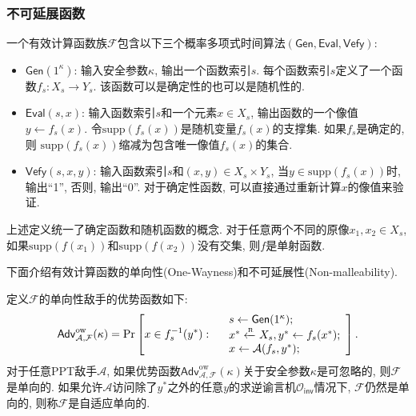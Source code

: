 \subsubsection{不可延展函数}
\begin{definition}[有效计算函数]
一个有效计算函数族$\mathcal{F}$包含以下三个概率多项式时间算法$(\mathsf{Gen}, \mathsf{Eval}, \mathsf{Vefy})$:  
\begin{itemize}
\item $\mathsf{Gen}(1^\kappa)$: 输入安全参数$\kappa$, 输出一个函数索引$s$. 每个函数索引$s$定义了一个函数$f_s: X_s \rightarrow Y_s$. 该函数可以是确定性的也可以是随机性的.

\item $\mathsf{Eval}(s, x)$: 输入函数索引$s$和一个元素$x \in X_s$, 输出函数的一个像值$y \leftarrow f_s(x)$. 令$\text{supp}(f_s(x))$是随机变量$f_s(x)$的支撑集. 如果$f_s$是确定的, 则 $\text{supp}(f_s(x))$缩减为包含唯一像值$f_s(x)$的集合.

\item $\mathsf{Vefy}(s, x, y)$: 输入函数索引$s$和$(x, y) \in X_s \times Y_s$, 当$y \in \text{supp}(f_s(x))$时, 输出``1'', 否则, 输出``0''. 对于确定性函数, 可以直接通过重新计算$x$的像值来验证.  
\end{itemize}
\end{definition}

\begin{note}
上述定义统一了确定函数和随机函数的概念. 对于任意两个不同的原像$x_1, x_2 \in X_s$, 如果$\text{supp}(f(x_1))$和$\text{supp}(f(x_2))$没有交集, 则$f$是单射函数.  
\end{note}

下面介绍有效计算函数的单向性(One-Wayness)和不可延展性(Non-malleability).
\begin{definition}[单向性和自适应单向性]\label{def:OW}
定义$\mathcal{F}$的单向性敌手的优势函数如下:
\begin{displaymath}
	\mathsf{Adv}_{\mathcal{A}, \mathcal{F}}^{\text{ow}}(\kappa) =
		\Pr \left[x \in  f_s^{-1}(y^*):
		\begin{array}{ll}
           	& s \leftarrow \mathsf{Gen}(1^\kappa);\\
			& x^* \xleftarrow{\textup{\tiny R}} X_s, y^* \leftarrow f_s(x^*);\\
			& x \leftarrow \mathcal{A}(f_s, y^*);
		\end{array} 
		\right].
\end{displaymath}
对于任意PPT敌手$\mathcal{A}$, 如果优势函数$\mathsf{Adv}_{\mathcal{A}, \mathcal{F}}^{\text{ow}}(\kappa)$关于安全参数$\kappa$是可忽略的, 则$\mathcal{F}$是单向的. 如果允许$\mathcal{A}$访问除了$y^*$之外的任意$y$的求逆谕言机$\mathcal{O}_\mathsf{inv}$情况下, $\mathcal{F}$仍然是单向的, 则称$\mathcal{F}$是自适应单向的.    
\end{definition}

